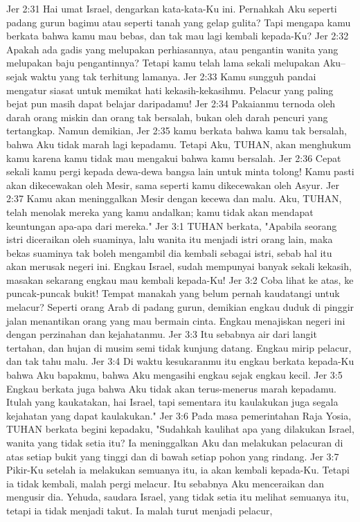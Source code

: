 Jer 2:31  Hai umat Israel, dengarkan kata-kata-Ku ini. Pernahkah Aku seperti padang gurun bagimu atau seperti tanah yang gelap gulita? Tapi mengapa kamu berkata bahwa kamu mau bebas, dan tak mau lagi kembali kepada-Ku?
Jer 2:32  Apakah ada gadis yang melupakan perhiasannya, atau pengantin wanita yang melupakan baju pengantinnya? Tetapi kamu telah lama sekali melupakan Aku--sejak waktu yang tak terhitung lamanya.
Jer 2:33  Kamu sungguh pandai mengatur siasat untuk memikat hati kekasih-kekasihmu. Pelacur yang paling bejat pun masih dapat belajar daripadamu!
Jer 2:34  Pakaianmu ternoda oleh darah orang miskin dan orang tak bersalah, bukan oleh darah pencuri yang tertangkap. Namun demikian,
Jer 2:35  kamu berkata bahwa kamu tak bersalah, bahwa Aku tidak marah lagi kepadamu. Tetapi Aku, TUHAN, akan menghukum kamu karena kamu tidak mau mengakui bahwa kamu bersalah.
Jer 2:36  Cepat sekali kamu pergi kepada dewa-dewa bangsa lain untuk minta tolong! Kamu pasti akan dikecewakan oleh Mesir, sama seperti kamu dikecewakan oleh Asyur.
Jer 2:37  Kamu akan meninggalkan Mesir dengan kecewa dan malu. Aku, TUHAN, telah menolak mereka yang kamu andalkan; kamu tidak akan mendapat keuntungan apa-apa dari mereka."
Jer 3:1  TUHAN berkata, "Apabila seorang istri diceraikan oleh suaminya, lalu wanita itu menjadi istri orang lain, maka bekas suaminya tak boleh mengambil dia kembali sebagai istri, sebab hal itu akan merusak negeri ini. Engkau Israel, sudah mempunyai banyak sekali kekasih, masakan sekarang engkau mau kembali kepada-Ku!
Jer 3:2  Coba lihat ke atas, ke puncak-puncak bukit! Tempat manakah yang belum pernah kaudatangi untuk melacur? Seperti orang Arab di padang gurun, demikian engkau duduk di pinggir jalan menantikan orang yang mau bermain cinta. Engkau menajiskan negeri ini dengan perzinahan dan kejahatanmu.
Jer 3:3  Itu sebabnya air dari langit tertahan, dan hujan di musim semi tidak kunjung datang. Engkau mirip pelacur, dan tak tahu malu.
Jer 3:4  Di waktu kesukaranmu itu engkau berkata kepada-Ku bahwa Aku bapakmu, bahwa Aku mengasihi engkau sejak engkau kecil.
Jer 3:5  Engkau berkata juga bahwa Aku tidak akan terus-menerus marah kepadamu. Itulah yang kaukatakan, hai Israel, tapi sementara itu kaulakukan juga segala kejahatan yang dapat kaulakukan."
Jer 3:6  Pada masa pemerintahan Raja Yosia, TUHAN berkata begini kepadaku, "Sudahkah kaulihat apa yang dilakukan Israel, wanita yang tidak setia itu? Ia meninggalkan Aku dan melakukan pelacuran di atas setiap bukit yang tinggi dan di bawah setiap pohon yang rindang.
Jer 3:7  Pikir-Ku setelah ia melakukan semuanya itu, ia akan kembali kepada-Ku. Tetapi ia tidak kembali, malah pergi melacur. Itu sebabnya Aku menceraikan dan mengusir dia. Yehuda, saudara Israel, yang tidak setia itu melihat semuanya itu, tetapi ia tidak menjadi takut. Ia malah turut menjadi pelacur,

